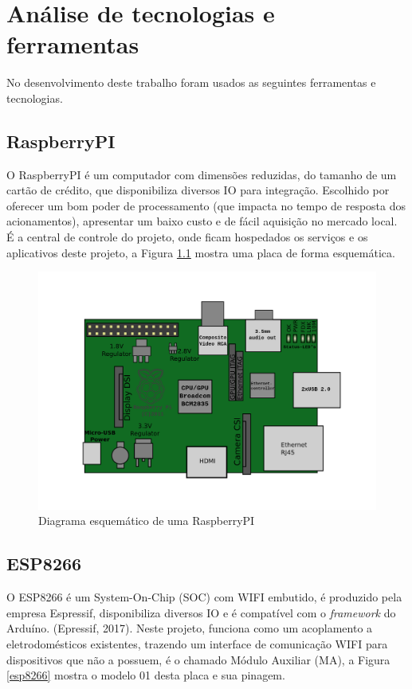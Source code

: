 \chapter{Análise de tecnologias e ferramentas}
No desenvolvimento deste trabalho foram usados as seguintes ferramentas e tecnologias.

\section{RaspberryPI}
O RaspberryPI é um computador com dimensões reduzidas, do tamanho de um cartão de crédito, que disponibiliza diversos IO para integração. Escolhido por oferecer um bom poder de processamento (que impacta no tempo de resposta dos acionamentos), apresentar um baixo custo e de fácil aquisição no mercado local. É a central de controle do projeto, onde ficam hospedados os serviços e os aplicativos deste projeto, a Figura \ref{raspberryPI} mostra uma placa de forma esquemática. \cite{RaspberryPI2017}

\begin{figure}[H]
\caption{\label{raspberryPI}Diagrama esquemático de uma RaspberryPI}
\includegraphics[scale=0.15]{img/raspberrypi.png}
\end{figure}

\section{ESP8266}
O ESP8266 é um System-On-Chip (SOC) com WIFI embutido, é produzido pela empresa Espressif, disponibiliza diversos IO e é compatível com o \textit{framework} do Arduíno. (Epressif, 2017). Neste projeto, funciona como um acoplamento a eletrodomésticos existentes, trazendo um interface de comunicação WIFI para dispositivos que não a possuem, é o chamado Módulo Auxiliar (MA), a Figura \ref{esp8266} mostra o modelo 01 desta placa e sua pinagem. \cite{Esp82662017}

